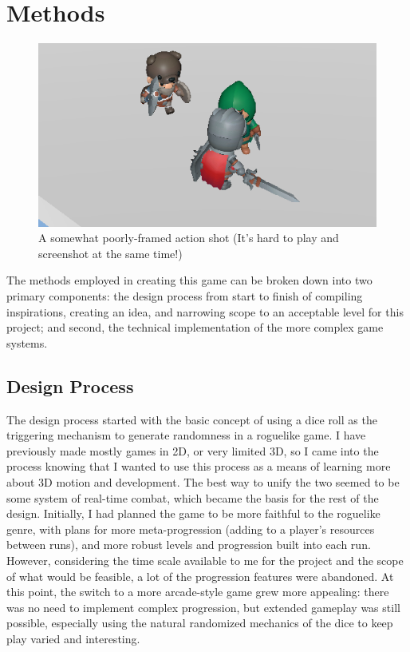 \documentclass[10pt,twocolumn]{article}
\begin{document}
\section{Methods}

\begin{figure}
    \centering
    \includegraphics[width=.95\linewidth]{fight.png}
    \caption{
        A somewhat poorly-framed action shot (It's hard to play and screenshot at the same time!)
    }
    \label{fig:first-page}
\end{figure}

The methods employed in creating this game can be broken down into two primary components: the design process from start to finish of compiling inspirations, creating an idea, and narrowing scope to an acceptable level for this project; and second, the technical implementation of the more complex game systems. 

\subsection{Design Process}
The design process started with the basic concept of using a dice roll as the triggering mechanism to generate randomness in a roguelike game. I have previously made mostly games in 2D, or very limited 3D, so I came into the process knowing that I wanted to use this process as a means of learning more about 3D motion and development. The best way to unify the two seemed to be some system of real-time combat, which became the basis for the rest of the design.
Initially, I had planned the game to be more faithful to the roguelike genre, with plans for more meta-progression (adding to a player's resources between runs), and more robust levels and progression built into each run. However, considering the time scale available to me for the project and the scope of what would be feasible, a lot of the progression features were abandoned. At this point, the switch to a more arcade-style game grew more appealing: there was no need to implement complex progression, but extended gameplay was still possible, especially using the natural randomized mechanics of the dice to keep play varied and interesting.
\end{document}
